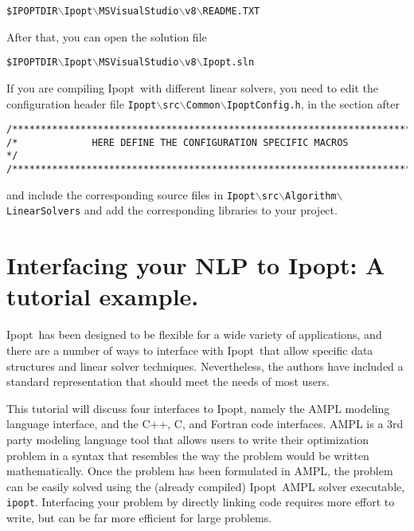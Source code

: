 \documentclass[10pt]{article}
\newcommand{\Ipopt}{{\sc Ipopt}}
\begin{document}
\texttt{\$IPOPTDIR$\backslash$Ipopt$\backslash$MSVisualStudio$\backslash$v8$\backslash$README.TXT}

After that, you can open the solution file

\texttt{\$IPOPTDIR$\backslash$Ipopt$\backslash$MSVisualStudio$\backslash$v8$\backslash$Ipopt.sln}

If you are compiling \Ipopt\ with different linear solvers, you need
to edit the configuration header file
\texttt{Ipopt$\backslash$src$\backslash$Common$\backslash$IpoptConfig.h},
in the section after
\begin{verbatim}
/***************************************************************************/
/*             HERE DEFINE THE CONFIGURATION SPECIFIC MACROS               */
/***************************************************************************/
\end{verbatim}
and include the corresponding source files in
\texttt{Ipopt$\backslash$src$\backslash$Algorithm$\backslash$LinearSolvers}
and add the corresponding libraries to your project.

\section{Interfacing your NLP to \Ipopt: A tutorial example.}
\label{sec:tutorial-example}

\Ipopt\ has been designed to be flexible for a wide variety of
applications, and there are a number of ways to interface with \Ipopt\
that allow specific data structures and linear solver
techniques. Nevertheless, the authors have included a standard
representation that should meet the needs of most users.

This tutorial will discuss four interfaces to \Ipopt, namely the AMPL
modeling language\cite{FouGayKer:AMPLbook} interface, and the C++, C,
and Fortran code interfaces.  AMPL is a 3rd party modeling language
tool that allows users to write their optimization problem in a syntax
that resembles the way the problem would be written mathematically.
Once the problem has been formulated in AMPL, the problem can be
easily solved using the (already compiled) \Ipopt\ AMPL solver
executable, {\tt ipopt}. Interfacing your problem by directly linking
code requires more effort to write, but can be far more efficient for
large problems.
\end{document}
